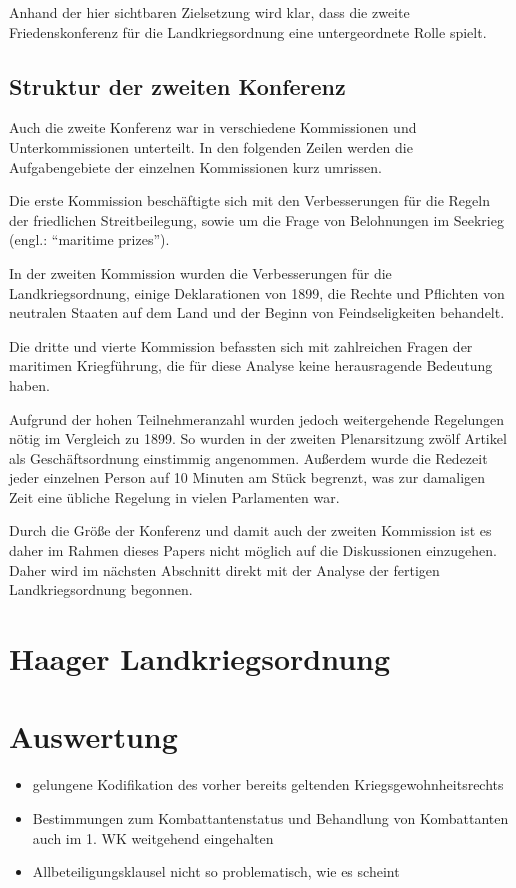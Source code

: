 \documentclass[12pt]{scrartcl}
\begin{document}
Anhand der hier sichtbaren Zielsetzung wird klar, dass die zweite Friedenskonferenz für die Landkriegsordnung eine untergeordnete Rolle spielt.

\subsection{Struktur der zweiten Konferenz}

Auch die zweite Konferenz war in verschiedene Kommissionen und Unterkommissionen unterteilt. In den folgenden Zeilen werden die Aufgabengebiete der einzelnen Kommissionen kurz umrissen.

Die erste Kommission beschäftigte sich mit den Verbesserungen für die Regeln der friedlichen Streitbeilegung, sowie um die Frage von Belohnungen im Seekrieg (engl.: "`maritime prizes"').

In der zweiten Kommission wurden die Verbesserungen für die Landkriegsordnung, einige Deklarationen von 1899, die Rechte und Pflichten von neutralen Staaten auf dem Land und der Beginn von Feindseligkeiten behandelt.

Die dritte und vierte Kommission befassten sich mit zahlreichen Fragen der maritimen Kriegführung, die für diese Analyse keine herausragende Bedeutung haben. 

Aufgrund der hohen Teilnehmeranzahl wurden jedoch weitergehende Regelungen nötig im Vergleich zu 1899. So wurden in der zweiten Plenarsitzung zwölf Artikel als Geschäftsordnung einstimmig angenommen. Außerdem wurde die Redezeit jeder einzelnen Person auf 10 Minuten am Stück begrenzt, was zur damaligen Zeit eine übliche Regelung in vielen Parlamenten war.\cite{Scott-V1-1921}

Durch die Größe der Konferenz und damit auch der zweiten Kommission ist es daher im Rahmen dieses Papers nicht möglich auf die Diskussionen einzugehen. Daher wird im nächsten Abschnitt direkt mit der Analyse der fertigen Landkriegsordnung begonnen.

\section{Haager Landkriegsordnung}


\section{Auswertung}
\begin{itemize}
	\item gelungene Kodifikation des vorher bereits geltenden Kriegsgewohnheitsrechts
	\item Bestimmungen zum Kombattantenstatus und Behandlung von Kombattanten auch im 1. WK weitgehend eingehalten
	\item Allbeteiligungsklausel nicht so problematisch, wie es scheint
\end{itemize}
\cite{Gasser1991}
\cite{Lingen2014}
\cite{Fraenkel1968}
\cite{Heffter1951}
\cite{DeutschesReich2010}
\end{document}
